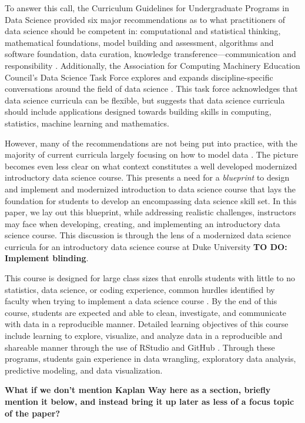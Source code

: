 \documentclass[
  12pt]{article}
\begin{document}
To answer this call, the Curriculum Guidelines for Undergraduate
Programs in Data Science provided six major recommendations as to what
practitioners of data science should be competent in: computational and
statistical thinking, mathematical foundations, model building and
assessment, algorithms and software foundation, data curation, knowledge
transference---communication and responsibility \citep{veaux_2017}.
Additionally, the Association for Computing Machinery Education
Council's Data Science Task Force explores and expands
discipline-specific conversations around the field of data science
\citep{Danyluk_2021}. This task force acknowledges that data science
curricula can be flexible, but suggests that data science curricula
should include applications designed towards building skills in
computing, statistics, machine learning and mathematics.

However, many of the recommendations are not being put into practice,
with the majority of current curricula largely focusing on how to model
data \citep{Donoho2017}. The picture becomes even less clear on what
context constitutes a well developed modernized introductory data
science course. This presents a need for a \emph{blueprint} to design
and implement and modernized introduction to data science course that
lays the foundation for students to develop an encompassing data science
skill set. In this paper, we lay out this blueprint, while addressing
realistic challenges, instructors may face when developing, creating,
and implementing an introductory data science course. This discussion is
through the lens of a modernized data science curricula for an
introductory data science course at Duke University \textbf{TO DO:
Implement blinding}.

This course is designed for large class sizes that enrolls students with
little to no statistics, data science, or coding experience, common
hurdles identified by faculty when trying to implement a data science
course \citep{Schwab2020}. By the end of this course, students are
expected and able to clean, investigate, and communicate with data in a
reproducible manner. Detailed learning objectives of this course include
learning to explore, visualize, and analyze data in a reproducible and
shareable manner through the use of RStudio and GitHub
\citep{R21, github}. Through these programs, students gain experience in
data wrangling, exploratory data analysis, predictive modeling, and data
visualization.

\textbf{What if we don't mention Kaplan Way here as a section, briefly
mention it below, and instead bring it up later as less of a focus topic
of the paper?}
\end{document}
